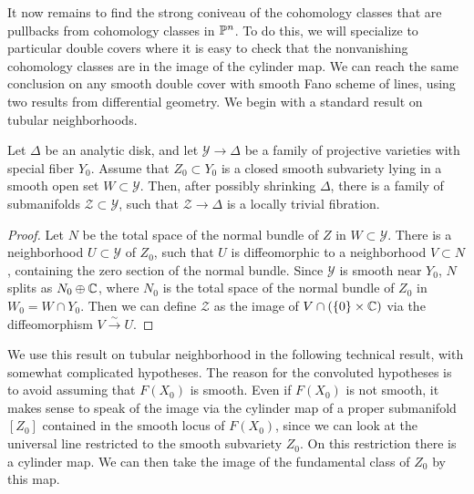 
It now remains to find the strong coniveau of the cohomology classes that are pullbacks from cohomology classes in $\P^n$. To do this, we will specialize to particular double covers where it is easy to check that the nonvanishing cohomology classes are in the image of the cylinder map. We can reach the same conclusion on any smooth double cover with smooth Fano scheme of lines, using two results from differential geometry. We begin with a standard result on tubular neighborhoods.

\begin{lemma}
\label{lem:Z0Deform}
  Let $\Delta$ be an analytic disk, and let $\mathscr{Y} \to \Delta$ be a family of projective varieties with special fiber $Y_0$. Assume that $Z_0 \subset Y_0$ is a closed smooth subvariety lying in a smooth open set $W \subset \mathscr{Y}$. Then, after possibly shrinking $\Delta$, there is a family of submanifolds $\mathscr{Z} \subset \mathscr{Y}$, such that $\mathscr{Z} \to \Delta$ is a locally trivial fibration.
\end{lemma}
\begin{proof}
  Let $N$ be the total space of the normal bundle of $Z$ in $W \subset \mathscr{Y}$. There is a neighborhood $U \subset \mathscr{Y}$ of $Z_0$, such that $U$ is diffeomorphic to a neighborhood $V \subset N$, containing the zero section of the normal bundle. Since $\mathscr{Y}$ is smooth near $Y_0$, $N$ splits as $N_0 \oplus \C$, where $N_0$ is the total space of the normal bundle of $Z_0$ in $W_0 = W \cap Y_0$. Then we can define $\mathscr{Z}$ as the image of $V \cap (\set{0} \times \C)$ via the diffeomorphism $V \xrightarrow{\sim} U$.
\end{proof}

We use this result on tubular neighborhood in the following technical result, with somewhat complicated hypotheses. The reason for the convoluted hypotheses is to avoid assuming that $F(X_0)$ is smooth. Even if $F(X_0)$ is not smooth, it makes sense to speak of the image via the cylinder map of a proper submanifold $[Z_0]$ contained in the smooth locus of $F(X_0)$, since we can look at the universal line restricted to the smooth subvariety $Z_0$. On this restriction there is a cylinder map. We can then take the image of the fundamental class of $Z_0$ by this map.

